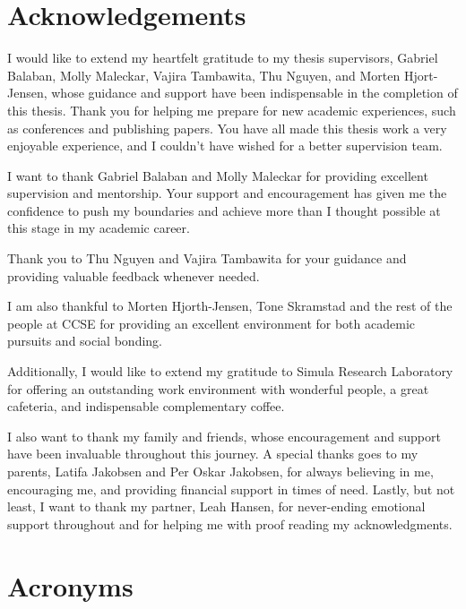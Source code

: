 \documentclass[USenglish]{uiomasterthesis}  %
\begin{document}
\newpage

\section*{Acknowledgements}
I would like to extend my heartfelt gratitude to my thesis supervisors, Gabriel Balaban, Molly Maleckar, Vajira Tambawita, Thu Nguyen, and Morten Hjort-Jensen, whose guidance and support have been indispensable in the completion of this thesis. Thank you for helping me prepare for new academic experiences, such as conferences and publishing papers. You have all made this thesis work a very enjoyable experience, and I couldn't have wished for a better supervision team.

I want to thank Gabriel Balaban and Molly Maleckar for providing excellent supervision and mentorship. 
Your support and encouragement has given me the confidence to push my boundaries and achieve more than I thought possible at this stage in my academic career.

Thank you to Thu Nguyen and Vajira Tambawita for your guidance and providing valuable feedback whenever needed.

I am also thankful to Morten Hjorth-Jensen, Tone Skramstad and the rest of the people at CCSE for providing an excellent environment for both academic pursuits and social bonding.


Additionally, I would like to extend my gratitude to Simula Research Laboratory for offering an outstanding work environment with wonderful people, a great cafeteria, and indispensable complementary coffee.

I also want to thank my family and friends, whose encouragement and support have been invaluable throughout this journey. A special thanks goes to my parents, Latifa Jakobsen and Per Oskar Jakobsen, for always believing in me, encouraging me, and providing financial support in times of need.
Lastly, but not least, I want to thank my partner, Leah Hansen, for never-ending emotional support throughout and for helping me with proof reading my acknowledgments.


\newpage


\tableofcontents
\newpage
\section*{Acronyms}
\begin{acronym}
\end{acronym}






\newpage

\newpage

\newpage

\newpage

\newpage

\appendix

\printbibliography
\end{document}
